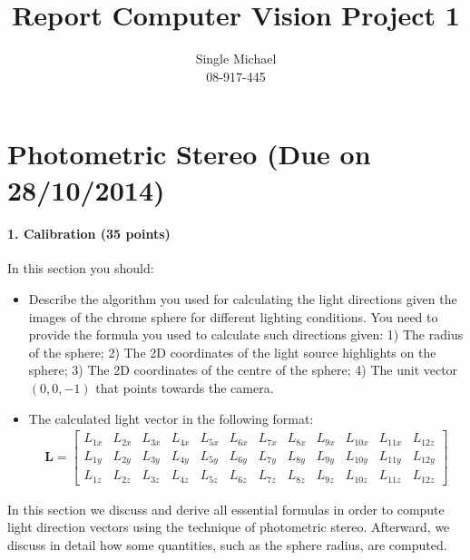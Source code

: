 \documentclass{paper}
\title{Report Computer Vision Project 1}
\author{Single Michael\\08-917-445}
\begin{document}
\maketitle


%

\section{Photometric Stereo (Due on 28/10/2014)}



\paragraph{1. Calibration (35 points)}
In this section you should:

\begin{itemize}
\item Describe the algorithm you used for calculating the light directions given the images of the chrome sphere for different lighting conditions. You need to provide the formula you used to calculate such directions given: 1) The radius of the sphere; 2) The 2D coordinates of the light source highlights on the sphere; 3) The 2D coordinates of the centre of the sphere; 4) The unit vector $(0,0,-1)$ that points towards the camera.
\item The calculated light vector in the following format: 
\begin{align}
\mathbf{L}= \left[ \begin{array}{cccccccccccccc}
L_{1x} & L_{2x} & L_{3x} & L_{4x} & L_{5x} & L_{6x} & L_{7x} & L_{8x} & L_{9x} & L_{10x} & L_{11x} & L_{12z}\\
L_{1y} & L_{2y} & L_{3y} & L_{4y} & L_{5y} & L_{6y} & L_{7y} & L_{8y} & L_{9y} & L_{10y} & L_{11y} & L_{12y}\\
L_{1z} & L_{2z} & L_{3z} & L_{4z} & L_{5z} & L_{6z} & L_{7z} & L_{8z} & L_{9z} & L_{10z} & L_{11z} & L_{12z}
\end{array} \right] \nonumber
\end{align}
\end{itemize}

In this section we discuss and derive all essential formulas in order to compute light direction vectors using the technique of photometric stereo. Afterward, we discuss in detail how some quantities, such as the sphere radius, are computed.  \\
\end{document}
